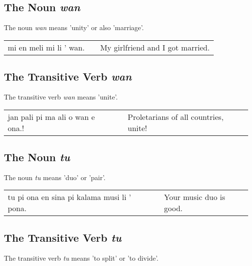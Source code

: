 %
\subsection*{The Noun \textit{wan}}
%
%
The noun \textit{wan} means 'unity' or also 'marriage'.

\begin{supertabular}{p{5,5cm}|ll}
    mi en meli mi li ' wan. &  & My girlfriend and I got married. \\
\end{supertabular}

%
\subsection*{The Transitive Verb \textit{wan}}
%
%
The transitive verb \textit{wan} means 'unite'.

\begin{supertabular}{p{5,5cm}|ll}
    jan pali pi ma ali o wan e ona.! &  & Proletarians of all countries, unite! \\
\end{supertabular}

%
\subsection*{The Noun \textit{tu}}
%
%
The noun \textit{tu} means 'duo' or 'pair'.

\begin{supertabular}{p{5,5cm}|ll}
    tu pi ona en sina pi kalama musi li ' pona. &  & Your music duo is good. \\
\end{supertabular}

%
%
\subsection*{The Transitive Verb \textit{tu}}
%
%
The transitive verb \textit{tu} means 'to split' or 'to divide'.

